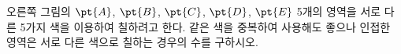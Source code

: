 \noindent\begin{minipage}[t]{0.58\linewidth}\vspace{0pt}\raggedright 오른쪽 그림의 $\pt{A}$, $\pt{B}$, $\pt{C}$, $\pt{D}$, $\pt{E}$ 5개의 영역을 서로 다른 5가지 색을 이용하여 칠하려고 한다. 같은 색을 중복하여 사용해도 좋으나 인접한 영역은 서로 다른 색으로 칠하는 경우의 수를 구하시오. \end{minipage}\hfill\begin{minipage}[t]{0.4\linewidth}\vspace{0pt}\centering \resizebox{\ifdim\width>\linewidth\linewidth\else\width\fi}{!}{}\end{minipage}\par
